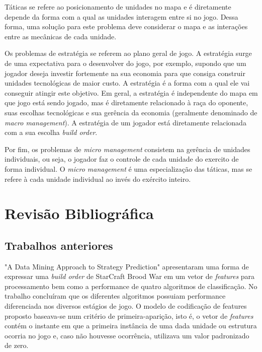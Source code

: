 Táticas se refere ao posicionamento de unidades no mapa e é diretamente depende da forma com a qual as unidades interagem entre si no jogo. Dessa forma, uma solução para este problema deve considerar o mapa e as interações entre as mecânicas de cada unidade.

Os problemas de estratégia se referem ao plano geral de jogo. A estratégia surge de uma expectativa para o desenvolver do jogo, por exemplo, supondo que um jogador deseja investir fortemente na sua economia para que consiga construir unidades tecnológicas de maior custo. A estratégia é a forma com a qual ele vai conseguir atingir este objetivo. Em geral, a estratégia é independente do mapa em que jogo está sendo jogado, mas é diretamente relacionado à raça do oponente, suas escolhas tecnológicas e sua gerência da economia (geralmente denominado de \textit{macro management}). A estratégia de um jogador está diretamente relacionada com a sua escolha \textit{build order}.

Por fim, os problemas de \textit{micro management} consistem na gerência de unidades individuais, ou seja, o jogador faz o controle de cada unidade do exercito de forma individual. O  \textit{micro management} é uma especialização das táticas, mas se refere à cada unidade individual ao invés do exército inteiro.

	\chapter{Revisão Bibliográfica}
		\section{Trabalhos anteriores}
"A Data Mining Approach to Strategy Prediction" \cite{weber2009data} apresentaram uma forma de expressar uma \textit{build order} de StarCraft Brood War em um vetor de \textit{features} para processamento bem como a performance de quatro algoritmos de classificação. No trabalho concluíram que os diferentes algoritmos possuiam performance diferenciada nos diversos estágios de jogo. O modelo de codificação de features proposto baseava-se num critério de primeira-aparição, isto é, o vetor de \textit{features} contém o instante em que a primeira instância de uma dada unidade ou estrutura ocorria no jogo e, caso não houvesse ocorrência, utilizava um valor padronizado de zero.

